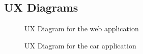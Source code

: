 \documentclass[english]{article}
\begin{document}
\subsection{UX Diagrams}

\begin{figure}[H]
	\centering
	\caption{UX Diagram for the web application}
\end{figure}

\begin{figure}[H]
	\centering
	\caption{UX Diagram for the car application}
\end{figure}
\end{document}
